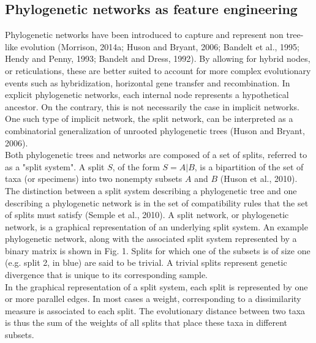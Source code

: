 \documentclass{bioinfo}
\begin{document}
\subsection{Phylogenetic networks as feature engineering}
Phylogenetic networks have been introduced to capture and represent non tree-like evolution (Morrison, 2014a; Huson and Bryant, 2006; Bandelt et al., 1995; Hendy and Penny, 1993; Bandelt and Dress, 1992). By allowing for hybrid nodes, or reticulations, these are better suited to account for more complex evolutionary events such as hybridization, horizontal gene transfer and recombination. In explicit phylogenetic networks, each internal node represents a hypothetical ancestor. On the contrary, this is not necessarily the case in implicit networks.  One such type of implicit network, the split network, can be interpreted as a combinatorial generalization of unrooted phylogenetic trees (Huson and Bryant, 2006).\\
Both phylogenetic trees and networks are composed of a set of splits, referred to as a "split system". A split $S$, of the form $S = A|B$, is a bipartition of the set of taxa (or specimens) into two nonempty subsets $A$ and $B$ (Huson et al., 2010). The distinction between a split system describing a phylogenetic tree and one describing a phylogenetic network is in the set of compatibility rules that the set of splits must satisfy (Semple et al., 2010). A split network, or phylogenetic network, is a graphical representation of an underlying split system. An example phylogenetic network, along with the associated split system represented by a binary matrix is shown in Fig. 1. Splits for which one of the subsets is of size one (e.g. split 2, in blue) are said to be trivial. A trivial splits represent genetic divergence that is unique to its corresponding sample.\\
In the graphical representation of a split system, each split is represented by one or more parallel edges. In most cases a weight, corresponding to a dissimilarity measure is associated to each split. The evolutionary distance between two taxa is thus the sum of the weights of all splits that place these taxa in different subsets.
\end{document}
